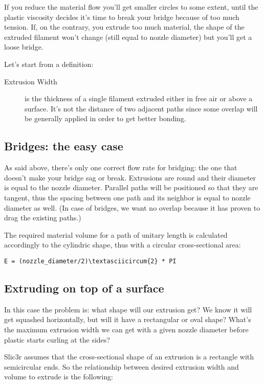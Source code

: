 If you reduce the material flow you'll get smaller circles to some extent, until the plastic viscosity decides it's time to break your bridge because of too much tension. If, on the contrary, you extrude too much material, the shape of the extruded filament won't change (still equal to nozzle diameter) but you'll get a loose bridge.

Let's start from a definition:

\begin{description}
\item[Extrusion Width] is the thickness of a single filament extruded either in free air or above a surface. It's not the distance of two adjacent paths since some overlap will be generally applied in order to get better bonding.
\end{description}

\subsection{Bridges: the easy case}
\label{sec:bridges}

As said above, there's only one correct flow rate for bridging: the one that doesn't make your bridge sag or break. Extrusions are round and their diameter is equal to the nozzle diameter. Parallel paths will be positioned so that they are tangent, thus the spacing between one path and its neighbor is equal to nozzle diameter as well. (In case of bridges, we want no overlap because it has proven to drag the existing paths.)

The required material volume for a path of unitary length is calculated accordingly to the cylindric shape, thus with a circular cross-sectional area:

\verb|E = (nozzle_diameter/2)\textasciicircum{2} * PI|

\subsection{Extruding on top of a surface}
\label{sec:extruding_on_surface}

In this case the problem is: what shape will our extrusion get? We know it will get squashed horizontally, but will it have a rectangular or oval shape? What's the maximum extrusion width we can get with a given nozzle diameter before plastic starts curling at the sides?

Slic3r assumes that the cross-sectional shape of an extrusion is a rectangle with semicircular ends. So the relationship between desired extrusion width and volume to extrude is the following:

